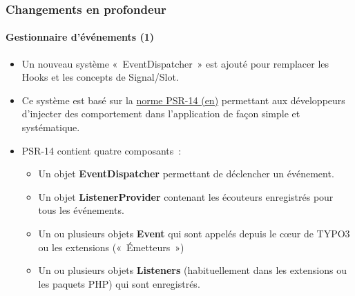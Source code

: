 \begin{frame}[fragile]
	\frametitle{Changements en profondeur}
	\framesubtitle{Gestionnaire d'événements (1)}

	\begin{itemize}
		\item Un nouveau système «~EventDispatcher~» est ajouté pour remplacer les Hooks et
			les concepts de Signal/Slot.

		\item Ce système est basé sur la \href{https://www.php-fig.org/psr/psr-14}{norme PSR-14 (en)}
			permettant aux développeurs d'injecter des comportement dans l'application de façon
			simple et systématique.

		\item PSR-14 contient quatre composants~:

			\begin{itemize}
				\item Un objet \textbf{EventDispatcher} permettant de déclencher un événement.
				\item Un objet \textbf{ListenerProvider} contenant les écouteurs enregistrés pour
					tous les événements.
				\item Un ou plusieurs objets \textbf{Event} qui sont appelés depuis le cœur de TYPO3
					ou les extensions («~Émetteurs~»)
				\item Un ou plusieurs objets \textbf{Listeners} (habituellement dans les extensions
					ou les paquets PHP) qui sont enregistrés.
			\end{itemize}


	\end{itemize}

\end{frame}


